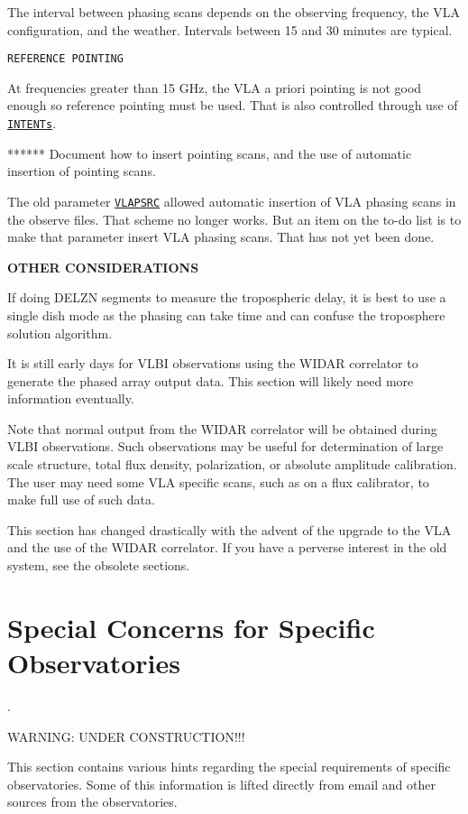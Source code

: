 \documentclass{report}
\begin{document}
The interval between phasing scans depends on the observing frequency,
the VLA configuration, and the weather.  Intervals between 15 and 30 minutes
are typical. %

{\tt REFERENCE POINTING}

At frequencies greater than 15 GHz, the VLA a priori pointing is not good enough so
reference pointing must be used.  That is also controlled through use
of 
{\hyperref[MP:INTENTs]{{\tt INTENTs}}}.

******  Document how to insert pointing scans, and the use of 
automatic insertion of pointing scans.

The old parameter 
{\hyperref[MP:VLAPSRC]{{\tt VLAPSRC}}} allowed automatic
insertion of VLA phasing scans in the observe files.  That scheme no 
longer works.  But an item on the to-do list is to make that parameter
insert VLA phasing scans.  That has not yet been done.


{\bf OTHER CONSIDERATIONS}

If doing DELZN segments to measure the tropospheric delay, it is best
to use a single dish mode as the phasing can take time and can confuse 
the troposphere solution algorithm.

It is still early days for VLBI observations using the WIDAR correlator
to generate the phased array output data.  This section will likely
need more information eventually.

Note that normal output from the WIDAR correlator will be obtained during
VLBI observations.  Such observations may be useful for determination 
of large scale structure, total flux density, polarization, or absolute
amplitude calibration.  The user may need some VLA specific scans, such
as on a flux calibrator, to make full use of such data.

This section has changed drastically with the advent of the upgrade
to the VLA and the use of the WIDAR correlator.  If you have a perverse
interest in the old system, see the obsolete sections.


\section{\label{SEC:INDIV}Special Concerns for Specific Observatories}.

WARNING:  UNDER CONSTRUCTION!!!

This section contains various hints regarding the special requirements
of specific observatories.  Some of this information is lifted directly
from email and other sources from the observatories.
\end{document}
